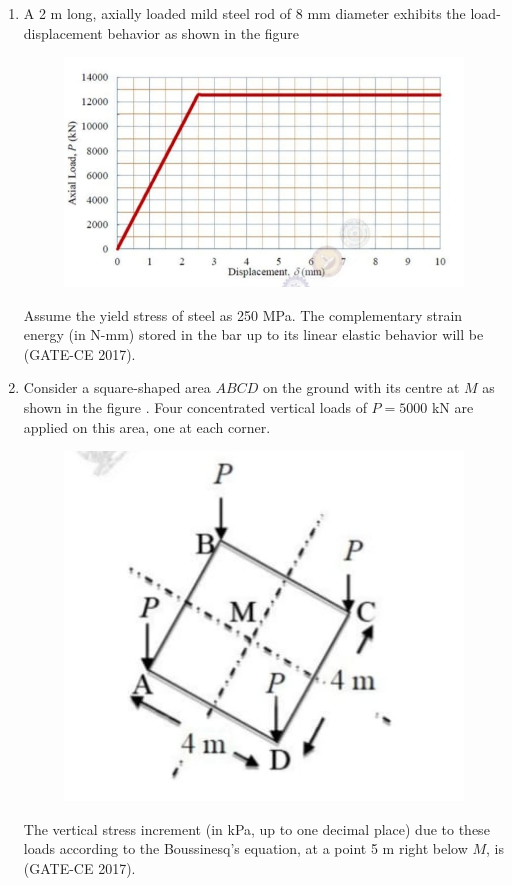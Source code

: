 \documentclass[journal,12pt,onecolumn]{article}
\theoremstyle{remark}
\begin{document}
\begin{enumerate}
    \item A 2 m long, axially loaded mild steel rod of 8 mm diameter exhibits the load-displacement  behavior as shown in the figure 
    \begin{figure}[H]
    \centering
    \includegraphics[width=0.7\columnwidth]{q43.jpg}  
    \caption{}
    \label{fig:12}
    \end{figure}
    Assume the yield stress of steel as 250 MPa. The complementary strain energy (in N-mm) stored in the bar up to its linear elastic behavior will be \underline{\hspace{3cm}} \hfill (GATE-CE 2017).

    \item Consider a square-shaped area $ABCD$ on the ground with its centre at $M$ as shown in the figure  . Four concentrated vertical loads of $ P = 5000 $ kN are applied on this area, one at each corner.
    \begin{figure}[H]
    \centering
    \includegraphics[width=0.7\columnwidth]{q44.jpg}  
    \caption{}
    \label{fig:13}
    \end{figure}
    The vertical stress increment (in kPa, up to one decimal place) due to these loads according to the Boussinesq's equation, at a point 5 m right below $M$, is \underline{\hspace{3cm}} \hfill (GATE-CE 2017).


\end{enumerate}
\end{document}
